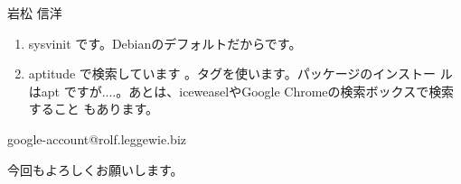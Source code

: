 \begin{prework}{ 岩松 信洋 }

\begin{enumerate}
\item sysvinit です。Debianのデフォルトだからです。
\item aptitude で検索しています 。タグを使います。パッケージのインストー
      ルはapt ですが....。あとは、iceweaselやGoogle Chromeの検索ボックスで検索すること
      もあります。
\end{enumerate}
\end{prework}


\begin{prework}{ google-account@rolf.leggewie.biz }

今回もよろしくお願いします。

\end{prework}


